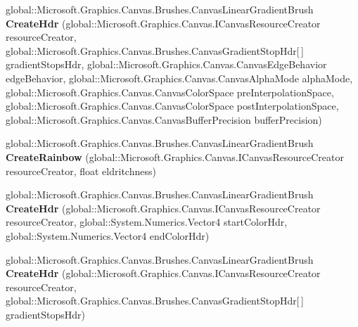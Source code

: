 \begin{DoxyCompactItemize}
global\+::\+Microsoft.\+Graphics.\+Canvas.\+Brushes.\+Canvas\+Linear\+Gradient\+Brush {\bfseries Create\+Hdr} (global\+::\+Microsoft.\+Graphics.\+Canvas.\+I\+Canvas\+Resource\+Creator resource\+Creator, global\+::\+Microsoft.\+Graphics.\+Canvas.\+Brushes.\+Canvas\+Gradient\+Stop\+Hdr\mbox{[}$\,$\mbox{]} gradient\+Stops\+Hdr, global\+::\+Microsoft.\+Graphics.\+Canvas.\+Canvas\+Edge\+Behavior edge\+Behavior, global\+::\+Microsoft.\+Graphics.\+Canvas.\+Canvas\+Alpha\+Mode alpha\+Mode, global\+::\+Microsoft.\+Graphics.\+Canvas.\+Canvas\+Color\+Space pre\+Interpolation\+Space, global\+::\+Microsoft.\+Graphics.\+Canvas.\+Canvas\+Color\+Space post\+Interpolation\+Space, global\+::\+Microsoft.\+Graphics.\+Canvas.\+Canvas\+Buffer\+Precision buffer\+Precision)
\item 
\mbox{\label{interface_microsoft_1_1_graphics_1_1_canvas_1_1_brushes_1_1_i_canvas_linear_gradient_brush_statics_a10b64033cc76bb4670af23e94b8b6d1c}} 
global\+::\+Microsoft.\+Graphics.\+Canvas.\+Brushes.\+Canvas\+Linear\+Gradient\+Brush {\bfseries Create\+Rainbow} (global\+::\+Microsoft.\+Graphics.\+Canvas.\+I\+Canvas\+Resource\+Creator resource\+Creator, float eldritchness)
\item 
\mbox{\label{interface_microsoft_1_1_graphics_1_1_canvas_1_1_brushes_1_1_i_canvas_linear_gradient_brush_statics_aa478a0f38fa948c5b103ee834fb17cb9}} 
global\+::\+Microsoft.\+Graphics.\+Canvas.\+Brushes.\+Canvas\+Linear\+Gradient\+Brush {\bfseries Create\+Hdr} (global\+::\+Microsoft.\+Graphics.\+Canvas.\+I\+Canvas\+Resource\+Creator resource\+Creator, global\+::\+System.\+Numerics.\+Vector4 start\+Color\+Hdr, global\+::\+System.\+Numerics.\+Vector4 end\+Color\+Hdr)
\item 
\mbox{\label{interface_microsoft_1_1_graphics_1_1_canvas_1_1_brushes_1_1_i_canvas_linear_gradient_brush_statics_ac231ec716863bab8840f768a97c723a7}} 
global\+::\+Microsoft.\+Graphics.\+Canvas.\+Brushes.\+Canvas\+Linear\+Gradient\+Brush {\bfseries Create\+Hdr} (global\+::\+Microsoft.\+Graphics.\+Canvas.\+I\+Canvas\+Resource\+Creator resource\+Creator, global\+::\+Microsoft.\+Graphics.\+Canvas.\+Brushes.\+Canvas\+Gradient\+Stop\+Hdr\mbox{[}$\,$\mbox{]} gradient\+Stops\+Hdr)

\end{DoxyCompactItemize}
